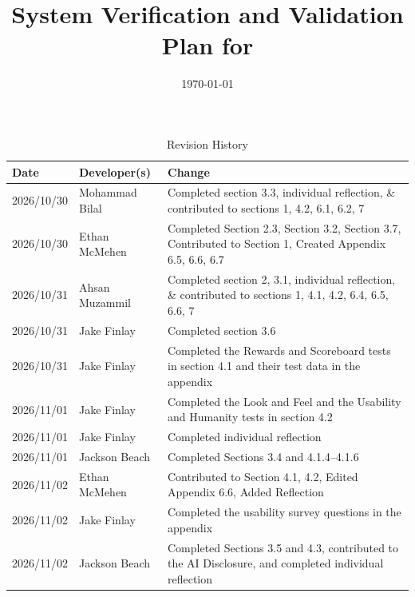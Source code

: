 \documentclass[10pt,titlepage]{article}
\begin{document}
\title{System Verification and Validation Plan for \progname{}} 
\author{\authname}
\date{\today}
	
\maketitle


\begin{table}[!htbp]
\caption{Revision History} \label{TblRevisionHistory}
\begin{tabularx}{\textwidth}{llX}
\toprule
\textbf{Date} & \textbf{Developer(s)} & \textbf{Change}\\
\midrule
2026/10/30 & Mohammad Bilal & Completed section 3.3, individual reflection, \& contributed to sections 1, 4.2, 6.1, 6.2, 7 \\
2026/10/30 & Ethan McMehen & Completed Section 2.3, Section 3.2, Section 3.7, Contributed to Section 1, Created Appendix 6.5, 6.6, 6.7 \\
2026/10/31 & Ahsan Muzammil & Completed section 2, 3.1, individual reflection, \& contributed to sections 1, 4.1, 4.2, 6.4, 6.5, 6.6, 7 \\
2026/10/31 & Jake Finlay & Completed section 3.6 \\
2026/10/31 & Jake Finlay & Completed the Rewards and Scoreboard tests in section 4.1 and their test data in the appendix \\
2026/11/01 & Jake Finlay & Completed the Look and Feel and the Usability and Humanity tests in section 4.2 \\
2026/11/01 & Jake Finlay & Completed individual reflection \\
2026/11/01 & Jackson Beach & Completed Sections 3.4 and 4.1.4--4.1.6 \\
2026/11/02 & Ethan McMehen & Contributed to Section 4.1, 4.2, Edited Appendix 6.6, Added Reflection \\
2026/11/02 & Jake Finlay & Completed the usability survey questions in the appendix \\
2026/11/02 & Jackson Beach & Completed Sections 3.5 and 4.3, contributed to the AI Disclosure, and completed individual reflection \\
\bottomrule
\end{tabularx}
\end{table}

\newpage

\tableofcontents

\newpage
\end{document}
